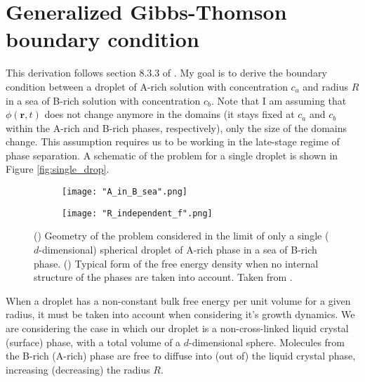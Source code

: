 \documentclass[12pt]{article}
\begin{document}

\section{Generalized Gibbs-Thomson boundary condition}
This derivation follows section 8.3.3 of \cite{Doi_Ch8}. My goal is to derive the boundary condition between a droplet of A-rich solution with concentration $c_a$ and radius $R$ in a sea of B-rich solution with concentration $c_b$. Note that I am assuming that $\phi(\bm{r},t)$ does not change anymore in the domains (it stays fixed at $c_a$ and $c_b$ within the A-rich and B-rich phases, respectively), only the size of the domains change. This assumption requires us to be working in the late-stage regime of phase separation. A schematic of the problem for a single droplet is shown in Figure \ref{fig:single_drop}.

\begin{figure}[H]
	\centering
	\begin{subfigure}[t]{0.45\textwidth}
		\texttt{[image: "A\_in\_B\_sea".png]}
		\caption{}
		\label{fig:ABsea}
	\end{subfigure}\qquad%
	\begin{subfigure}[t]{0.45\textwidth}
		\texttt{[image: "R\_independent\_f".png]}
		\caption{}
		\label{fig:f_phi}
	\end{subfigure}
	\caption{(\protect{}) Geometry of the problem considered in the limit of only a single ($d$-dimensional) spherical droplet of A-rich phase in a sea of B-rich phase. (\protect{}) Typical form of the free energy density when no internal structure of the phases are taken into account. Taken from \cite{Doi_Ch8}.}
\end{figure}\label{fig:single_drop}

When a droplet has a non-constant bulk free energy per unit volume for a given radius, it must be taken into account when considering it's growth dynamics. We are considering the case in which our droplet is a non-cross-linked liquid crystal (surface) phase, with a total volume of a $d$-dimensional sphere. Molecules from the B-rich (A-rich) phase are free to diffuse into (out of) the liquid crystal phase, increasing (decreasing) the radius $R$.
\end{document}
